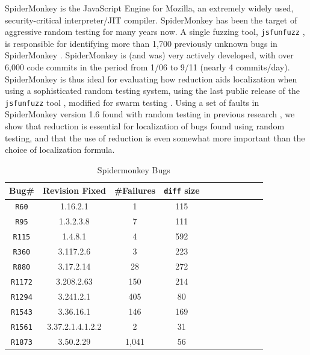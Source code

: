SpiderMonkey is the JavaScript Engine for Mozilla, an extremely widely
used, security-critical interpreter/JIT compiler.  SpiderMonkey has
been the target of aggressive random testing for many years now.  A
single fuzzing tool, \texttt{jsfunfuzz} \cite{jsfunfuzz}, is
responsible for identifying more than 1,700 previously unknown bugs in
SpiderMonkey \cite{jsfunfuzzbugs}.  SpiderMonkey is (and was) very
actively developed, with over 6,000 code commits in the period from
1/06 to 9/11 (nearly 4 commits/day).  SpiderMonkey is thus ideal for
evaluating how reduction aids localization when using a sophisticated
random testing system, using the last public release of the
\texttt{jsfunfuzz} tool \cite{jsfunfuzz}, modified for swarm testing \cite{ISSTA12}.
Using a set of faults in SpiderMonkey version 1.6 found with random
testing in previous research \cite{PLDI13}, we show that reduction is
essential for localization of bugs found using random testing, and
that the use of reduction is even somewhat more important than the
choice of localization formula.  


\begin{table}
\begin{center}
\begin{tabular}{|c||c|c|c|c|c||c|c|c|c|c|}
\hline

\hline
Bug\# & Revision Fixed &  \#Failures & {\tt diff} size \\
\hline
\hline
{\tt R60} & 1.16.2.1 & 1 & 115  \\
\hline
{\tt R95} & 1.3.2.3.8 & 7 & 111   \\
\hline
{\tt R115} & 1.4.8.1 & 4 & 592   \\
\hline
{\tt R360} & 3.117.2.6 & 3 & 223  \\
\hline
{\tt R880} & 3.17.2.14 & 28 & 272   \\ 
\hline
{\tt R1172} & 3.208.2.63 & 150 & 214  \\
\hline
{\tt R1294} & 3.241.2.1 & 405 & 80  \\
\hline
{\tt R1543} & 3.36.16.1 & 146 & 169  \\
\hline
{\tt R1561} & 3.37.2.1.4.1.2.2 & 2 & 31  \\
\hline
{\tt R1873} & 3.50.2.29 & 1,041 & 56  \\
\hline
\hline
\end{tabular}
\end{center}
\caption{Spidermonkey Bugs}
\label{tab:spiderbugs}
\end{table}


